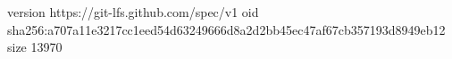 version https://git-lfs.github.com/spec/v1
oid sha256:a707a11e3217cc1eed54d63249666d8a2d2bb45ec47af67cb357193d8949eb12
size 13970
